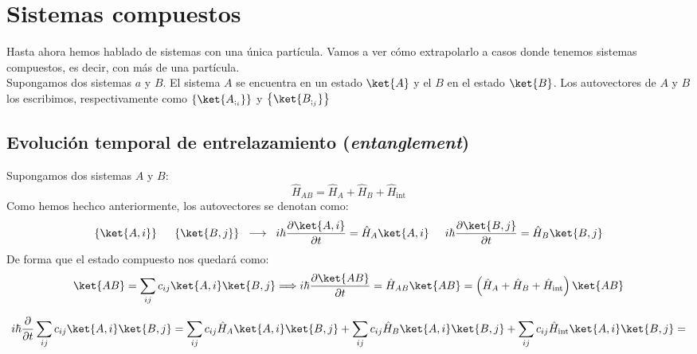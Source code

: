 \documentclass{report}
\begin{document}
\chapter{Sistemas compuestos}
  \noindent Hasta ahora hemos hablado de sistemas con una única 
  partícula. Vamos a ver cómo extrapolarlo a casos donde tenemos 
  sistemas compuestos, es decir, con más de una partícula.\\

  \noindent Supongamos dos sistemas $a$ y $B$. El sistema $A$ se 
  encuentra en un estado $\ket{A}$ y el $B$ en el estado $\ket{B}$. 
  Los autovectores de $A$ y $B$ los escribimos, respectivamente como
  $\left\{\ket{A_{;_i}}\right\}$ y $\left\{\ket{B_{;_j}}\right\}$

  \section{Evolución temporal de entrelazamiento (\textit{entanglement})}
    \noindent Supongamos dos sistemas $A$ y $B$:
    \[\hat{H}_{AB}=\hat{H}_A+\hat{H}_B+\hat{H}_\text{int}\]
    \noindent Como hemos hechco anteriormente, los autovectores se denotan como:
    \[\left\{\ket{A,i}\right\}\hspace{0.5cm}\left\{\ket{B,j}\right\}\hspace{0.2cm}\longrightarrow\hspace{0.2cm}
    i\hbar \dfrac{\partial\ket{A,i}}{\partial t}=\hat{H}_A\ket{A,i}\hspace{0.5cm}
    i\hbar \dfrac{\partial\ket{B,j}}{\partial t}=\hat{H}_B\ket{B,j}\]
    \noindent De forma que el estado compuesto nos quedará como:
    \[\ket{AB}=\sum_{ij}c_{ij}\ket{A,i}\ket{B,j}\Longrightarrow 
    i\hbar\dfrac{\partial \ket{AB}}{\partial t}=\hat{H}_{AB}\ket{AB}=
    \left(\hat{H}_A+\hat{H}_B+\hat{H}_\text{int}\right)\ket{AB}\]
    
    \[i\hbar\dfrac{\partial}{\partial t}\sum_{ij}c_{ij}\ket{A,i}\ket{B,j}=\sum_{ij}c_{ij}\hat{H}_A
    \ket{A,i}\ket{B,j}+\sum_{ij}c_{ij}\hat{H}_B\ket{A,i}\ket{B,j}+\sum_{ij}c_{ij}
    \hat{H}_\text{int}\ket{A,i}\ket{B,j}=\]
    
\end{document}
